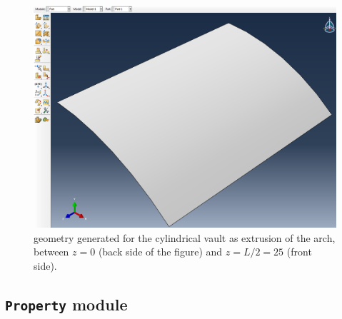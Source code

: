 \documentclass[english,a4paper,12pt]{article}
\begin{document}
\begin{figure}[h!tp]
\centering
\includegraphics[scale=0.35]{capturas/07-part.png}
\caption{geometry generated for the cylindrical vault as extrusion of the arch, between $z=0$ (back side of the figure) and $z=L/2=25$ (front side).}
\label{fig:extru1}
\end{figure}
\clearpage

\subsection{\texttt{Property} module}
\end{document}
